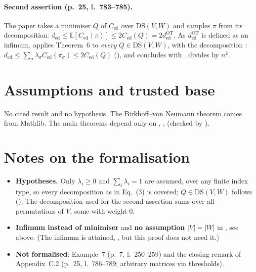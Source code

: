 \paragraph{Second assertion (p.~25, l.~783--785).} The paper takes a minimiser $Q$ of $C_{\mathrm{ed}}$ over
$\mathrm{DS}(V,W)$ and samples $\pi$ from its decomposition: $d_{\mathrm{ed}}\le\mathbb E[C_{\mathrm{ed}}(\pi)]\le
2C_{\mathrm{ed}}(Q)=2d^{\mathrm{OT}}_{\mathrm{ed}}$. As $d^{\mathrm{OT}}_{\mathrm{ed}}$ is defined as an infimum,
 applies Theorem~6 to \emph{every} $Q\in\mathrm{DS}(V,W)$, with the decomposition
: $d_{\mathrm{ed}}\le\sum_\sigma\lambda_\sigma C_{\mathrm{ed}}(\pi_\sigma)\le
2C_{\mathrm{ed}}(Q)$ (), and concludes with .  divides by
$n^2$.

\section{Assumptions and trusted base}
No cited result and no hypothesis. The Birkhoff--von Neumann theorem comes from Mathlib. The main theorems
depend only on , ,  (checked by
).

\section{Notes on the formalisation}
\begin{itemize}
\item \textbf{Hypotheses.} Only $\lambda_i\ge0$ and $\sum_i\lambda_i=1$ are assumed, over any finite index type, so
  every decomposition as in Eq.~(3) is covered; $Q\in\mathrm{DS}(V,W)$ follows ().
  The decomposition  used for the second assertion sums over all
  permutations of $V$, some with weight $0$.
\item \textbf{Infimum instead of minimiser} and \textbf{no assumption $|V|=|W|$} in ,
  see above. (The infimum is attained, , but this proof does not need it.)
\item \textbf{Not formalised}: Example~7 (p.~7, l.~250--259) and the closing remark of Appendix~C.2 (p.~25,
  l.~786--789; arbitrary matrices via thresholds).
\end{itemize}

